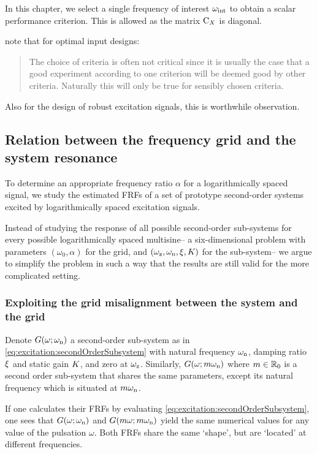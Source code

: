   In this chapter, we select a single frequency of interest $\omega_{\mathrm{int}}$ to obtain a scalar performance criterion.
  This is allowed as the matrix $\mathrm{C}_{X}$ is diagonal.

\begin{remark}
\citet{Goodwin1977} note that for optimal input designs:
\begin{quote}
The choice of criteria is often not critical since it is usually the case that a good experiment according to one criterion will be deemed good by other criteria. 
Naturally this will only be true for sensibly chosen criteria.
\end{quote}
Also for the design of robust excitation signals, this is worthwhile observation.
\end{remark}

  \subsection{Relation between the frequency grid and the system resonance} 
  \label{sec:excitation:relationLogGridSystem}
  To determine an appropriate frequency ratio $\alpha$ for a logarithmically spaced signal, we study the estimated \glspl{FRF} of a set of prototype second-order systems excited by logarithmically spaced excitation signals.

  Instead of studying the response of all possible second-order sub-systems for every possible logarithmically spaced multisine-- a six-dimensional problem with parameters $(\omega_0, \alpha)$ for the grid, and $(\omega_{\mathrm{z}}, \omega_{\mathrm{n}}, \xi_{}, K_{})$ for the sub-system-- we argue to simplify the problem in such a way that the results are still valid for the more complicated setting.

  \subsubsection{Exploiting the grid misalignment between the system and the grid}
  Denote $G(\omega; \omega_{\mathrm{n}})$ a second-order sub-system as in \eqref{eq:excitation:secondOrderSubsystem} with natural frequency $\omega_{\mathrm{n}}$, damping ratio $\xi_{}$ and static gain $K_{}$, and zero at $\omega_{\mathrm{z}}$.
  Similarly, $G(\omega; m\omega_{\mathrm{n}})$ where $m \in {\ensuremath{\mathbb{R}}}_{0}$ is a second order sub-system that shares the same parameters, except its natural frequency which is situated at $m\omega_{\mathrm{n}}$.

  If one calculates their \glspl{FRF} by evaluating \eqref{eq:excitation:secondOrderSubsystem}, one sees that $G(\omega; \omega_{\mathrm{n}})$ and $G(m\omega; m\omega_{\mathrm{n}})$ yield the same numerical values for any value of the pulsation $\omega$.
  Both \glspl{FRF} share the same `shape', but are `located' at different frequencies.

